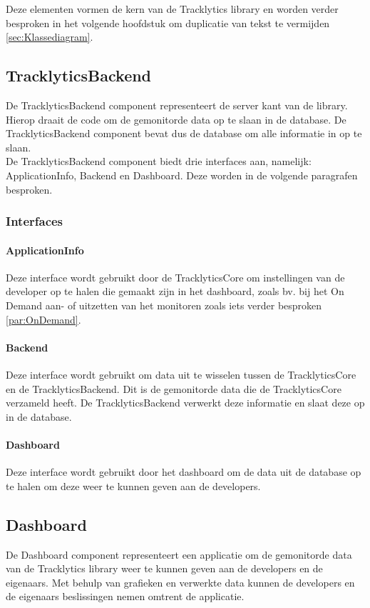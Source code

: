 Deze elementen vormen de kern van de Tracklytics library en worden verder besproken in het volgende hoofdstuk om duplicatie van tekst te vermijden \ref{sec:Klassediagram}. \\


\subsection{TracklyticsBackend}
De TracklyticsBackend component representeert de server kant van de library. Hierop draait de code om de gemonitorde data op te slaan in de database. De TracklyticsBackend component bevat dus de database om alle informatie in op te slaan. \\
De TracklyticsBackend component biedt drie interfaces aan, namelijk: ApplicationInfo, Backend en Dashboard. Deze worden in de volgende paragrafen besproken.\\

\subsubsection{Interfaces}
\paragraph{ApplicationInfo}
Deze interface wordt gebruikt door de TracklyticsCore om instellingen van de developer op te halen die gemaakt zijn in het dashboard, zoals bv. bij het On Demand aan- of uitzetten van het monitoren zoals iets verder besproken \ref{par:OnDemand}.

\paragraph{Backend}
Deze interface wordt gebruikt om data uit te wisselen tussen de TracklyticsCore en de TracklyticsBackend. Dit is de gemonitorde data die de TracklyticsCore verzameld heeft. De TracklyticsBackend verwerkt deze informatie en slaat deze op in de database.\\

\paragraph{Dashboard}
Deze interface wordt gebruikt door het dashboard om de data uit de database op te halen om deze weer te kunnen geven aan de developers. 

\subsection{Dashboard}
De Dashboard component representeert een applicatie om de gemonitorde data van de Tracklytics library weer te kunnen geven aan de developers en de eigenaars. Met behulp van grafieken en verwerkte data kunnen de developers en de eigenaars beslissingen nemen omtrent de applicatie.\\


